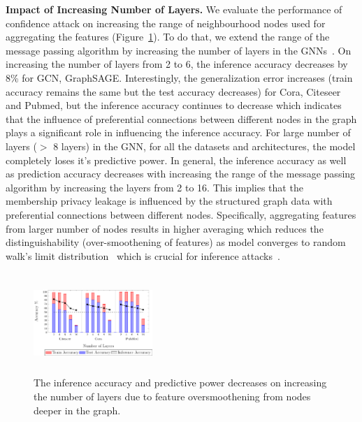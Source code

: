 \textbf{Impact of Increasing Number of Layers.} We evaluate the performance of confidence attack on increasing the range of neighbourhood nodes used for aggregating the features (Figure~\ref{fig:numlayers}).
To do that, we extend the range of the message passing algorithm by increasing the number of layers in the GNNs~\cite{klicpera2018combining,Li2018DeeperII}.
On increasing the number of layers from 2 to 6, the inference accuracy decreases by 8\% for GCN, GraphSAGE.
Interestingly, the generalization error increases (train accuracy remains the same but the test accuracy decreases) for Cora, Citeseer and Pubmed, but the inference accuracy continues to decrease which indicates that the influence of preferential connections between different nodes in the graph plays a significant role in influencing the inference accuracy. %
For large number of layers ($>$ 8 layers) in the GNN, for all the datasets and architectures, the model completely loses it's predictive power.
In general, the inference accuracy as well as prediction accuracy decreases with increasing the range of the message passing algorithm by increasing the layers from 2 to 16.
This implies that the membership privacy leakage is influenced by the structured graph data with preferential connections between different nodes.
Specifically, aggregating features from larger number of nodes results in higher averaging which reduces the distinguishability (over-smoothening of features) as model converges to random walk’s limit distribution~\cite{klicpera2018combining,Li2018DeeperII} which is crucial for inference attacks~\cite{membershipinf,ndss19salem}.


\begin{figure}[!htb]
\centering
\includegraphics[width=0.4\textwidth,height=3.8cm]{./figures/BBMIA/gsage_numlayers.pdf}
\caption{The inference accuracy and predictive power decreases on increasing the number of layers due to feature oversmoothening from nodes deeper in the graph.}
\label{fig:numlayers}
\end{figure}





